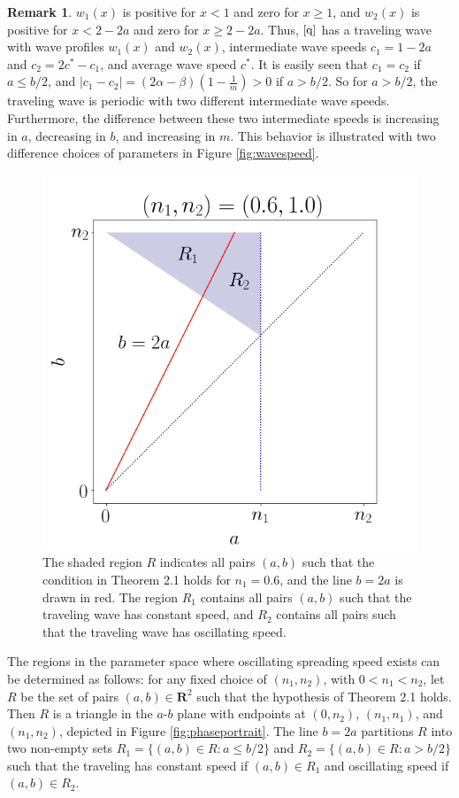 \documentclass[11pt]{article}
\theoremstyle{definition}
\newtheorem{rem}[thm]{Remark}
\numberwithin{equation}{section}
\numberwithin{thm}{section}
\renewcommand{\a}{a}
\renewcommand{\b}{b}
\newcommand{\m}{n_1}
\begin{document}
\begin{rem}
$w_1(x)$ is positive for $x<1$ and zero for $x\geq1$, and $w_2(x)$ is positive for $x<2-2a$ and zero for $x\geq 2-2a$. Thus, $\eqref{q}$ has a traveling wave with wave profiles $w_1(x)$ and $w_2(x)$, intermediate wave speeds $c_1=1-2a$ and $c_2=2c^*-c_1$,  and average wave speed  $c^*$.  It is easily seen that $c_1=c_2$ if $a \leq b/2$, and $|c_1-c_2|=(2\alpha-\beta)(1-\frac{1}{m})>0$ if $a>b/2$. So for $a>b/2$, the traveling wave is periodic with two different intermediate wave speeds. Furthermore, the difference between these two intermediate speeds is increasing in $a$, decreasing in $b$, and increasing in $m$. This behavior is illustrated with two difference choices of parameters in Figure \ref{fig:wavespeed}.
\end{rem}


\begin{figure}[h!] 
\centering
  \caption{The shaded region $R$ indicates all pairs $(\a,\b)$ such that the condition in Theorem 2.1 holds for $\m=0.6$, and the line $\b=2\a$ is drawn in red. The region $R_1$ contains all pairs $(\a,\b)$ such that the traveling wave has constant speed, and $R_2$ contains all pairs such that the traveling wave has oscillating speed.}
\label{fig4}
  \includegraphics[width=.5\linewidth]{figures/fig4.png}
\end{figure}

The regions in the parameter space where oscillating spreading speed exists can be determined as follows: for any fixed choice of $(n_1,n_2)$, with $0<n_1<n_2$, let $R$ be the set of pairs $(a,b)\in\mathbf R^2$ such that the hypothesis of Theorem 2.1 holds. Then $R$ is a triangle in the $a$-$b$ plane with endpoints at $(0,n_2)$, $(n_1,n_1)$, and $(n_1,n_2)$, depicted in Figure \ref{fig:phaseportrait}. The line $b=2a$ partitions $R$ into two non-empty sets $R_1=\{(a,b)\in R:a\leq b/2\}$ and $R_2=\{(a,b)\in R:a> b/2\}$ such that the traveling has constant speed if $(a,b)\in R_1$ and oscillating speed if $(a,b)\in R_2$.
\end{document}
